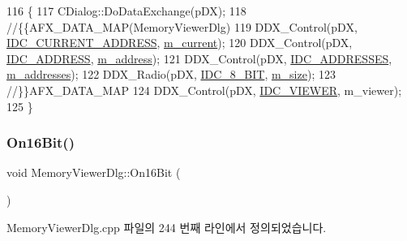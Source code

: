 \begin{DoxyCode}
116 \{
117   CDialog::DoDataExchange(pDX);
118   \textcolor{comment}{//\{\{AFX\_DATA\_MAP(MemoryViewerDlg)}
119   DDX\_Control(pDX, \mbox{\hyperlink{resource_8h_a276d745c58339acb548a3b1d2f2ce3fb}{IDC\_CURRENT\_ADDRESS}}, \mbox{\hyperlink{class_memory_viewer_dlg_a857486db87e66ac05d46733b0794aec7}{m\_current}});
120   DDX\_Control(pDX, \mbox{\hyperlink{resource_8h_af0726d27cf7b7070867a81fde283a218}{IDC\_ADDRESS}}, \mbox{\hyperlink{class_memory_viewer_dlg_aef3a67a90aa1b49c204d9d6a3910f13c}{m\_address}});
121   DDX\_Control(pDX, \mbox{\hyperlink{resource_8h_a900caa910614ea7f4cf4c2fa5ef5ef2f}{IDC\_ADDRESSES}}, \mbox{\hyperlink{class_memory_viewer_dlg_ac61656d575927b23941090002e5ce996}{m\_addresses}});
122   DDX\_Radio(pDX, \mbox{\hyperlink{resource_8h_a91648d6bfade78604103afe17af937bb}{IDC\_8\_BIT}}, \mbox{\hyperlink{class_memory_viewer_dlg_aa24e55d166ddeecb94fea8ab7ad4d836}{m\_size}});
123   \textcolor{comment}{//\}\}AFX\_DATA\_MAP}
124   DDX\_Control(pDX, \mbox{\hyperlink{resource_8h_a183e37b5faddaacf9f89ffbaf9eac751}{IDC\_VIEWER}}, m\_viewer);
125 \}
\end{DoxyCode}
\mbox{\label{class_memory_viewer_dlg_a61f6aec84a4bcf908dc32f9e85c871d0}} 
\subsubsection{\texorpdfstring{On16\+Bit()}{On16Bit()}}
{\footnotesize\ttfamily void Memory\+Viewer\+Dlg\+::\+On16\+Bit (\begin{DoxyParamCaption}{ }\end{DoxyParamCaption})\hspace{0.3cm}{\ttfamily [protected]}}



Memory\+Viewer\+Dlg.\+cpp 파일의 244 번째 라인에서 정의되었습니다.


